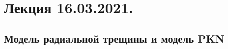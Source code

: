 \documentclass[main.tex]{subfiles}
\begin{document}

\section{Лекция 16.03.2021.}

\subsection{Модель радиальной трещины и модель PKN}
\end{document}
